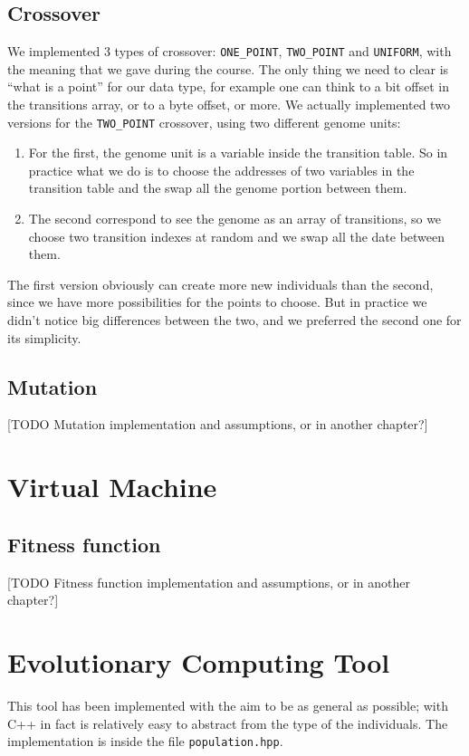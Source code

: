 \documentclass{report}
\begin{document}
\subsection{Crossover}
\label{sec:crossover}
We implemented 3 types of crossover: \texttt{ONE\_POINT}, \texttt{TWO\_POINT} and \texttt{UNIFORM}, with the meaning that we gave during the course. The only thing we need to clear is ``what is a point'' for our data type, for example one can think to a bit offset in the transitions array, or to a byte offset, or more.
We actually implemented two versions for the \texttt{TWO\_POINT} crossover, using two different genome units:

\begin{enumerate}
\item For the first, the genome unit is a variable inside the transition table. So in practice what we do is to choose the addresses of two variables in the transition table and the swap all the genome portion between them.
\item The second correspond to see the genome as an array of transitions, so we choose two transition indexes at random and we swap all the date between them.
\end{enumerate}

The first version obviously can create more new individuals than the second, since we have more possibilities for the points to choose. But in practice we didn't notice big differences between the two, and we preferred the second one for its simplicity.

\subsection{Mutation}
\label{sec:mutation}
[TODO Mutation implementation and assumptions, or in another chapter?]


\section{Virtual Machine}

\subsection{Fitness function}
\label{sec:fitness}
[TODO Fitness function implementation and assumptions, or in another chapter?]



\section{Evolutionary Computing Tool}
This tool has been implemented with the aim to be as general as possible; with C++ in fact is relatively easy to abstract from the type of the individuals. The implementation is inside the file \texttt{population.hpp}.
\end{document}
